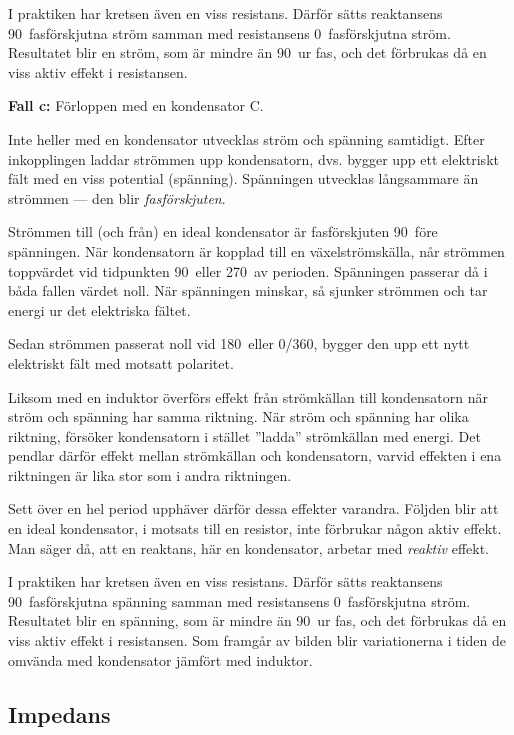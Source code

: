 I praktiken har kretsen även en viss resistans.
Därför sätts reaktansens 90\degree~fasförskjutna ström samman med resistansens
0\degree~fasförskjutna ström.
Resultatet blir en ström, som är mindre än 90\degree~ur fas, och det förbrukas
då en viss aktiv effekt i resistansen.

\textbf{Fall c:} Förloppen med en kondensator C.

Inte heller med en kondensator utvecklas ström och spänning samtidigt.
Efter inkopplingen laddar strömmen upp kondensatorn, dvs. bygger upp ett
elektriskt fält med en viss potential (spänning).
Spänningen utvecklas långsammare än strömmen --- den blir \emph{fasförskjuten}.

Strömmen till (och från) en ideal kondensator är fasförskjuten 90\degree~före
spänningen.
När kondensatorn är kopplad till en växelströmskälla, når strömmen toppvärdet
vid tidpunkten 90\degree~eller 270\degree~av perioden.
Spänningen passerar då i båda fallen värdet noll.
När spänningen minskar, så sjunker strömmen och tar energi ur det elektriska
fältet.

Sedan strömmen passerat noll vid 180\degree~eller 0\degree/360\degree, bygger
den upp ett nytt elektriskt fält med motsatt polaritet.

Liksom med en induktor överförs effekt från strömkällan till kondensatorn när
ström och spänning har samma riktning.
När ström och spänning har olika riktning, försöker kondensatorn i stället
''ladda'' strömkällan med energi.
Det pendlar därför effekt mellan strömkällan och kondensatorn, varvid effekten i
ena riktningen är lika stor som i andra riktningen.

Sett över en hel period upphäver därför dessa effekter varandra.
Följden blir att en ideal kondensator, i motsats till en resistor, inte
förbrukar någon aktiv effekt.
Man säger då, att en reaktans, här en kondensator, arbetar med \emph{reaktiv}
effekt.

I praktiken har kretsen även en viss resistans.
Därför sätts reaktansens 90\degree~fasförskjutna spänning samman med
resistansens 0\degree~fasförskjutna ström.
Resultatet blir en spänning, som är mindre än 90\degree~ur fas, och det
förbrukas då en viss aktiv effekt i resistansen.
Som framgår av bilden blir variationerna i tiden de omvända med kondensator
jämfört med induktor.

\subsection{Impedans}

